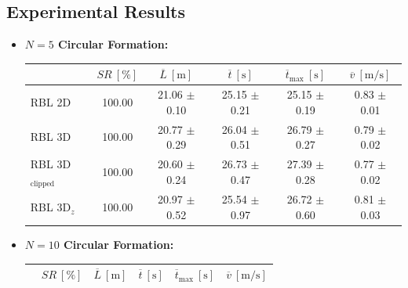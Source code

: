     \subsection{Experimental Results}
        \begin{itemize}
            \item \textbf{$N = 5$ Circular Formation:}
                \begin{table}[H]
                    \centering
                    \renewcommand{\arraystretch}{1.2}
                    \begin{tabular}{|l|c|c|c|c|c|}
                    \hline
                                                & \( SR \ [\%] \) & \( \overline{L} \ [\mathrm{m}] \) & \( \overline{t} \ [\mathrm{s}] \) & \( \overline{t}_{\text{max}} \ [\mathrm{s}] \) & \( \overline{v} \ [\mathrm{m/s}] \)     \\ \hline
                    RBL 2D                      & 100.00          & 21.06 $\pm$ 0.10                  & 25.15 $\pm$ 0.21                  & 25.15 $\pm$ 0.19                               & 0.83 $\pm$ 0.01                         \\ \hline
                    RBL 3D                      & 100.00          & 20.77 $\pm$ 0.29                  & 26.04 $\pm$ 0.51                  & 26.79 $\pm$ 0.27                               & 0.79 $\pm$ 0.02                         \\ \hline
                    RBL 3D\(_{\text{clipped}}\) & 100.00          & 20.60 $\pm$ 0.24                  & 26.73 $\pm$ 0.47                  & 27.39 $\pm$ 0.28                               & 0.77 $\pm$ 0.02                         \\ \hline
                    RBL 3D\(_z\)                & 100.00          & 20.97 $\pm$ 0.52                  & 25.54 $\pm$ 0.97                  & 26.72 $\pm$ 0.60                               & 0.81 $\pm$ 0.03                         \\ \hline
                    \end{tabular}
                \end{table}
            \item \textbf{$N = 10$ Circular Formation:}
                \begin{table}[H]
                    \centering
                    \renewcommand{\arraystretch}{1.2}
                    \begin{tabular}{|l|c|c|c|c|c|}
                    \hline
                                                & \( SR \ [\%] \) & \( \overline{L} \ [\mathrm{m}] \) & \( \overline{t} \ [\mathrm{s}] \) & \( \overline{t}_{\text{max}} \ [\mathrm{s}] \) & \( \overline{v} \ [\mathrm{m/s}] \)     \\ \hline

\end{tabular}
\end{table}
\end{itemize}

